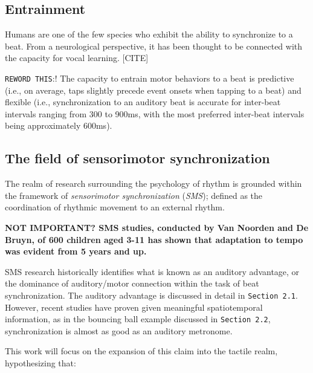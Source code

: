 \subsection{Entrainment}

Humans are one of the few species who exhibit the ability to synchronize to a beat. From a neurological perspective, it has been thought to be connected with the capacity for vocal learning. [CITE]

\verb!REWORD THIS!:!
The capacity to entrain motor behaviors to a beat is predictive (i.e., on average, taps slightly precede event onsets when tapping to a beat) and flexible (i.e., synchronization to an auditory beat is accurate for inter-beat intervals ranging from 300 to 900ms, with the most preferred inter-beat intervals being approximately 600ms).~\cite{repp2013sensorimotor}

\subsection{The field of sensorimotor synchronization}
The realm of research surrounding the psychology of rhythm is grounded within the framework of \textit{sensorimotor synchronization} (\textit{SMS}); defined as the coordination of rhythmic movement to an external rhythm. 

\textbf{NOT IMPORTANT? SMS studies, conducted by Van Noorden and De Bruyn, of 600 children aged 3-11 has shown that adaptation to tempo was evident from 5 years and up. \cite{repp2013sensorimotor} }

SMS research historically identifies what is known as an auditory advantage, or the dominance of auditory/motor connection within the task of beat synchronization. The auditory advantage is discussed in detail in \verb!Section 2.1!. However, recent studies have proven given meaningful spatiotemporal information, as in the bouncing ball example discussed in \verb!Section 2.2!, synchronization is almost as good as an auditory metronome.

This work will focus on the expansion of this claim into the tactile realm, hypothesizing that:
